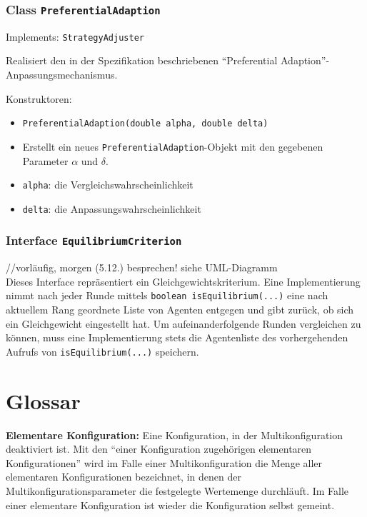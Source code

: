 \documentclass[parskip=full,11pt]{scrartcl}
\begin{document}
\subsubsection{Class \texttt{PreferentialAdaption}}
Implements: \texttt{StrategyAdjuster}

Realisiert den in der Spezifikation beschriebenen \enquote{Preferential Adaption}-Anpassungsmechanismus.

Konstruktoren:
\begin{itemize}\itemsep -10pt
\item \texttt{PreferentialAdaption(double alpha, double delta)}
\item[] Erstellt ein neues \texttt{PreferentialAdaption}-Objekt mit den gegebenen Parameter \(\alpha\) und \(\delta\).
\item[] \texttt{alpha}: die Vergleichswahrscheinlichkeit
\item[] \texttt{delta}: die Anpassungswahrscheinlichkeit
\end{itemize}

\subsubsection{Interface \texttt{EquilibriumCriterion}}
//vorläufig, morgen (5.12.) besprechen! siehe UML-Diagramm\\
Dieses Interface repräsentiert ein Gleichgewichtskriterium. Eine Implementierung nimmt nach jeder Runde mittels \texttt{boolean isEquilibrium(...)} eine nach aktuellem Rang geordnete Liste von Agenten entgegen und gibt zurück, ob sich ein Gleichgewicht eingestellt hat. Um aufeinanderfolgende Runden vergleichen zu können, muss eine Implementierung stets die Agentenliste des vorhergehenden Aufrufs von \texttt{isEquilibrium(...)} speichern.

\section{Glossar}
\textbf{Elementare Konfiguration:}
Eine Konfiguration, in der Multikonfiguration deaktiviert ist. Mit den \enquote{einer Konfiguration zugehörigen elementaren Konfigurationen} wird im Falle einer Multikonfiguration die Menge aller elementaren Konfigurationen bezeichnet, in denen der Multikonfigurationsparameter die festgelegte Wertemenge durchläuft. Im Falle einer elementare Konfiguration ist wieder die Konfiguration selbst gemeint.
\end{document}
